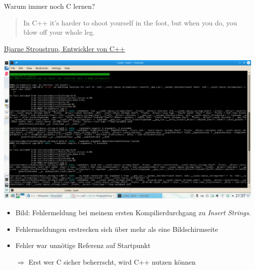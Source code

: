\begin{frame}{Warum immer noch C lernen?}
%
%
\begin{tcolorbox}[title=Zitat, height=4cm]
%
\vspace{5pt}
\begin{quotation}
In C++ it’s harder to shoot yourself in the foot, but when you do, you blow off your whole leg.
\end{quotation}
\vspace{-11pt}
%
\begin{flushright}
\footnotesize \href{https://www.youtube.com/watch?v=9QKHg8wj4MA}{Bjarne Stroustrup, Entwickler von C++}
\end{flushright}
%
\end{tcolorbox}
%
\includegraphics[width=.495\linewidth]{./gfx/cppFirst}
%
\begin{itemize}
\item Bild: Fehlermeldung bei meinem ersten Kompilierdurchgang zu \emph{Insert Strings}.
\item Fehlermeldungen erstrecken sich über mehr als eine Bildschirmseite
\item Fehler war unnötige Referenz auf Startpunkt
\item[$\Rightarrow$] Erst wer C sicher beherrscht, wird C++ nutzen können
\end{itemize}
%
\end{frame}


